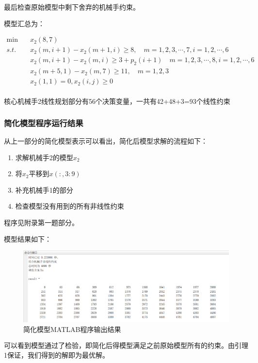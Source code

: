 \documentclass{ctexart}
\begin{document}
{{	最后检查原始模型中剩下舍弃的机械手约束。
	
	模型汇总为：
	
	$$
	\begin{aligned}
	\min \quad &x_2(8,7) \\
	s.t. \quad &x_2(m,i+1)-x_2(m+1,i) \ge 8,\quad m=1,2,3,\cdots,7, i=1,2,\cdots,6 \\
	\quad &x_2(m,i+1) - x_2(m,i) \ge 3+ p_2(i+1) \quad m=1,2,3,\cdots,8, i=1,2,\cdots,6 \\
	\quad &x_2(m+5,1) - x_2(m,7) \ge 11, \quad m=1,2,3 \\
	\quad &x_2(1,1)=0, x_2(i,j) \ge 0 \\
	\end{aligned}
	$$
	
	核心机械手2线性规划部分有56个决策变量，一共有42+48+3=93个线性约束
	
	
	\subsubsection{简化模型程序运行结果}
	
	从上一部分的简化模型表示可以看出，简化后模型求解的流程如下：
	
	\begin{enumerate}
		\item 求解机械手2的模型$x_2$
		\item 将$x_2$平移到$x(:,3:9)$
		\item 补充机械手1的部分
		\item 检查模型没有用到的所有非线性约束
	\end{enumerate}
	
	程序见附录第一题部分。
	
	模型结果如下：
	
	\begin{figure}[H]
		\centering
		\includegraphics[width = 0.9\linewidth]{P1Result.PNG}
		\caption{简化模型MATLAB程序输出结果}
	\end{figure}
	
	可以看到模型通过了检验，即简化后得模型满足之前原始模型所有的约束。由引理1保证，我们得到的解即为最优解。
}
	
}
\end{document}
